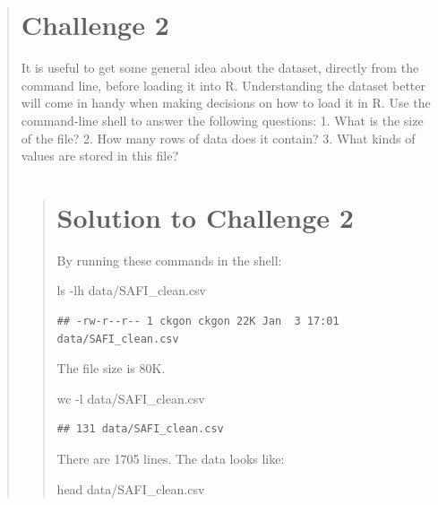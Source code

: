 \documentclass[]{book}
\newenvironment{Shaded}{\begin{snugshade}}{\end{snugshade}}
\newcommand{\FunctionTok}[1]{\textcolor[rgb]{0.00,0.00,0.00}{#1}}
\newcommand{\NormalTok}[1]{#1}
\begin{document}
\begin{quote}
\section{Challenge 2}\label{challenge-2}

It is useful to get some general idea about the dataset, directly from
the command line, before loading it into R. Understanding the dataset
better will come in handy when making decisions on how to load it in R.
Use the command-line shell to answer the following questions: 1. What is
the size of the file? 2. How many rows of data does it contain? 3. What
kinds of values are stored in this file?

\begin{quote}
\section{Solution to Challenge 2}\label{solution-to-challenge-2}

By running these commands in the shell:

\begin{Shaded}
\begin{Highlighting}[]
\FunctionTok{ls}\NormalTok{ -lh data/SAFI_clean.csv}
\end{Highlighting}
\end{Shaded}

\begin{verbatim}
## -rw-r--r-- 1 ckgon ckgon 22K Jan  3 17:01 data/SAFI_clean.csv
\end{verbatim}

The file size is 80K.

\begin{Shaded}
\begin{Highlighting}[]
\FunctionTok{wc}\NormalTok{ -l data/SAFI_clean.csv}
\end{Highlighting}
\end{Shaded}

\begin{verbatim}
## 131 data/SAFI_clean.csv
\end{verbatim}

There are 1705 lines. The data looks like:

\begin{Shaded}
\begin{Highlighting}[]
\FunctionTok{head}\NormalTok{ data/SAFI_clean.csv}
\end{Highlighting}
\end{Shaded}


\end{quote}
\end{quote}
\end{document}
